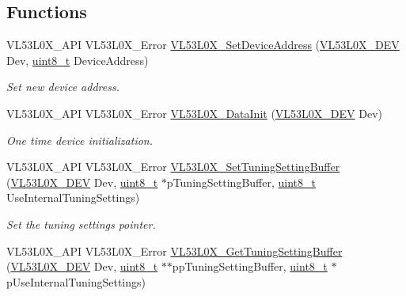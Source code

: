 \subsection*{Functions}
\begin{DoxyCompactItemize}
\item 
V\+L53\+L0\+X\+\_\+\+A\+PI V\+L53\+L0\+X\+\_\+\+Error \hyperlink{group__VL53L0X__init__group_ga7cb9d3ec8f6e74e921df2eeb600647d7}{V\+L53\+L0\+X\+\_\+\+Set\+Device\+Address} (\hyperlink{group__VL53L0X__platform__group_ga2d6405308b1dd524b462f1b8fb97d167}{V\+L53\+L0\+X\+\_\+\+D\+EV} Dev, \hyperlink{vl53l0x__types_8h_aba7bc1797add20fe3efdf37ced1182c5}{uint8\+\_\+t} Device\+Address)
\begin{DoxyCompactList}\small\item\em Set new device address. \end{DoxyCompactList}\item 
V\+L53\+L0\+X\+\_\+\+A\+PI V\+L53\+L0\+X\+\_\+\+Error \hyperlink{group__VL53L0X__init__group_gabb81d6ad638363d555a1b1b038b23354}{V\+L53\+L0\+X\+\_\+\+Data\+Init} (\hyperlink{group__VL53L0X__platform__group_ga2d6405308b1dd524b462f1b8fb97d167}{V\+L53\+L0\+X\+\_\+\+D\+EV} Dev)
\begin{DoxyCompactList}\small\item\em One time device initialization. \end{DoxyCompactList}\item 
V\+L53\+L0\+X\+\_\+\+A\+PI V\+L53\+L0\+X\+\_\+\+Error \hyperlink{group__VL53L0X__init__group_gabf9df2a66482932ebedab524ecedaaf1}{V\+L53\+L0\+X\+\_\+\+Set\+Tuning\+Setting\+Buffer} (\hyperlink{group__VL53L0X__platform__group_ga2d6405308b1dd524b462f1b8fb97d167}{V\+L53\+L0\+X\+\_\+\+D\+EV} Dev, \hyperlink{vl53l0x__types_8h_aba7bc1797add20fe3efdf37ced1182c5}{uint8\+\_\+t} $\ast$p\+Tuning\+Setting\+Buffer, \hyperlink{vl53l0x__types_8h_aba7bc1797add20fe3efdf37ced1182c5}{uint8\+\_\+t} Use\+Internal\+Tuning\+Settings)
\begin{DoxyCompactList}\small\item\em Set the tuning settings pointer. \end{DoxyCompactList}\item 
V\+L53\+L0\+X\+\_\+\+A\+PI V\+L53\+L0\+X\+\_\+\+Error \hyperlink{group__VL53L0X__init__group_ga6ecb2af8572433323cc3bff093bbf636}{V\+L53\+L0\+X\+\_\+\+Get\+Tuning\+Setting\+Buffer} (\hyperlink{group__VL53L0X__platform__group_ga2d6405308b1dd524b462f1b8fb97d167}{V\+L53\+L0\+X\+\_\+\+D\+EV} Dev, \hyperlink{vl53l0x__types_8h_aba7bc1797add20fe3efdf37ced1182c5}{uint8\+\_\+t} $\ast$$\ast$pp\+Tuning\+Setting\+Buffer, \hyperlink{vl53l0x__types_8h_aba7bc1797add20fe3efdf37ced1182c5}{uint8\+\_\+t} $\ast$p\+Use\+Internal\+Tuning\+Settings)
$$
\end{DoxyCompactItemize}
